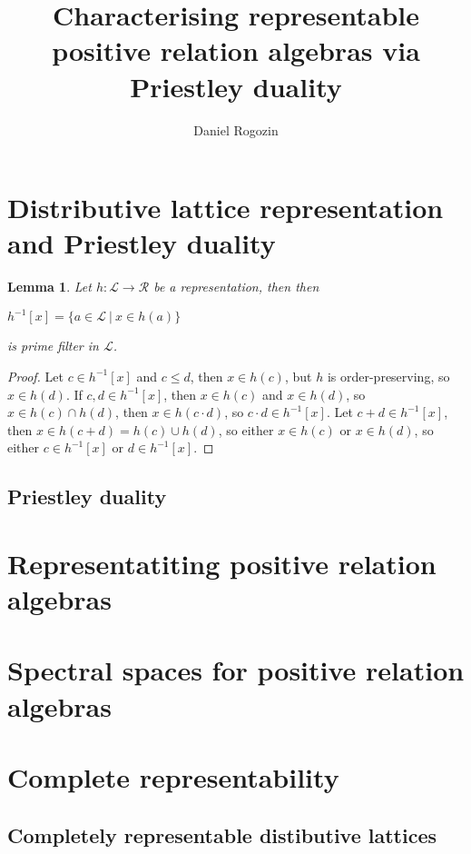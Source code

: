 \documentclass[a4paper]{article}
\author{Daniel Rogozin}
\date{}
\title{Characterising representable positive relation algebras via Priestley duality}
\theoremstyle{defin}
\theoremstyle{theorem}
\theoremstyle{claim}
\theoremstyle{prop}
\theoremstyle{lemma}
\newtheorem{lemma}{Lemma}
\theoremstyle{fact}
\theoremstyle{ex}
\theoremstyle{col}
\begin{document}
\maketitle

\nocite{*}

\section{Distributive lattice representation and Priestley duality}

\begin{lemma}
Let $h : \mathcal{L} \to \mathcal{R}$ be a representation, then then
\begin{center}
$h^{-1}[x] = \{ a \in \mathcal{L} \: | \: x \in h(a) \}$
\end{center}
is prime filter in $\mathcal{L}$.
\end{lemma}

\begin{proof}
Let $c \in h^{-1}[x]$ and $c \leq d$, then $x \in h(c)$, but $h$ is order-preserving, so $x \in h(d)$. If $c, d \in h^{-1}[x]$, then $x \in h(c)$ and $x \in h(d)$, so $x \in h(c) \cap h(d)$, then $x \in h(c \cdot d)$, so $c \cdot d \in h^{-1}[x]$. Let $c + d \in h^{-1}[x]$, then $x \in h(c + d) = h(c) \cup h(d)$, so either $x \in h(c)$ or $x \in h(d)$, so either $c \in h^{-1}[x]$ or $d \in h^{-1}[x]$.
\end{proof}

\subsection{Priestley duality}


\section{Representatiting positive relation algebras}

\section{Spectral spaces for positive relation algebras}

\section{Complete representability}

\subsection{Completely representable distibutive lattices}
\end{document}
